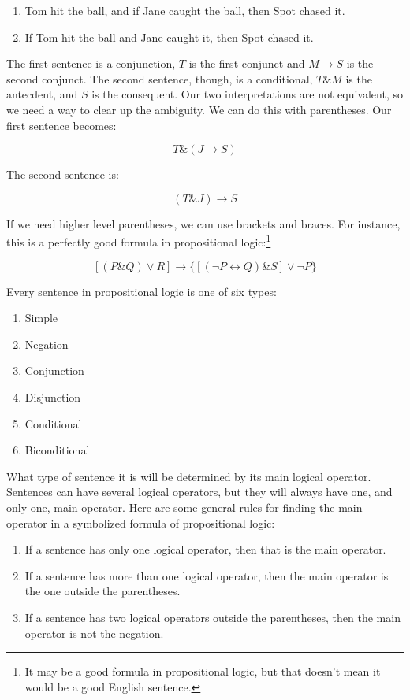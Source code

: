\begin{enumerate}

\item
  Tom hit the ball, and if Jane caught the ball, then Spot chased it.
\item
  If Tom hit the ball and Jane caught it, then Spot chased it.
\end{enumerate}

The first sentence is a conjunction, \(T\) is the first conjunct and \(M \rightarrow S\) is the second conjunct. The second sentence, though, is a conditional, \(T \mathbin{\&}M\) is the antecdent, and \(S\) is the consequent. Our two interpretations are not equivalent, so we need a way to clear up the ambiguity. We can do this with parentheses. Our first sentence becomes:

\[ T \mathbin{\&} (J \rightarrow S) \]

The second sentence is:

\[ (T \mathbin{\&} J) \rightarrow S\]

If we need higher level parentheses, we can use brackets and braces. For instance, this is a perfectly good formula in propositional logic:\footnote{It may be a good formula in propositional logic, but that doesn't mean it would be a good English sentence.}

\[ [(P \mathbin{\&} Q) \vee R] \rightarrow \{[(\neg P \leftrightarrow Q) \mathbin{\&} S] \vee \neg P\} \]

Every sentence in propositional logic is one of six types:

\begin{enumerate}

\item
  Simple
\item
  Negation
\item
  Conjunction
\item
  Disjunction
\item
  Conditional
\item
  Biconditional
\end{enumerate}

What type of sentence it is will be determined by its main logical operator. Sentences can have several logical operators, but they will always have one, and only one, main operator. Here are some general rules for finding the main operator in a symbolized formula of propositional logic:

\begin{enumerate}


\item
  If a sentence has only one logical operator, then that is the main operator.
\item
  If a sentence has more than one logical operator, then the main operator is the one outside the parentheses.
\item
  If a sentence has two logical operators outside the parentheses, then the main operator is not the negation.
\end{enumerate}

